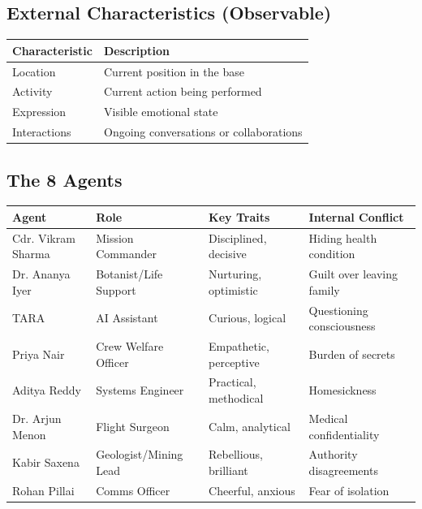 \documentclass[12pt,a4paper]{article}
\begin{document}
\subsection{External Characteristics (Observable)}

\begin{table}[H]
\centering
\small
\begin{tabular}{|l|l|}
\hline
\textbf{Characteristic} & \textbf{Description} \\
\hline
Location & Current position in the base \\
Activity & Current action being performed \\
Expression & Visible emotional state \\
Interactions & Ongoing conversations or collaborations \\
\hline
\end{tabular}
\end{table}

\subsection{The 8 Agents}

\begin{table}[H]
\centering
\small
\begin{tabular}{|l|l|l|l|}
\hline
\textbf{Agent} & \textbf{Role} & \textbf{Key Traits} & \textbf{Internal Conflict} \\
\hline
Cdr. Vikram Sharma & Mission Commander & Disciplined, decisive & Hiding health condition \\
Dr. Ananya Iyer & Botanist/Life Support & Nurturing, optimistic & Guilt over leaving family \\
TARA & AI Assistant & Curious, logical & Questioning consciousness \\
Priya Nair & Crew Welfare Officer & Empathetic, perceptive & Burden of secrets \\
Aditya Reddy & Systems Engineer & Practical, methodical & Homesickness \\
Dr. Arjun Menon & Flight Surgeon & Calm, analytical & Medical confidentiality \\
Kabir Saxena & Geologist/Mining Lead & Rebellious, brilliant & Authority disagreements \\
Rohan Pillai & Comms Officer & Cheerful, anxious & Fear of isolation \\
\hline
\end{tabular}
\end{table}
\end{document}
